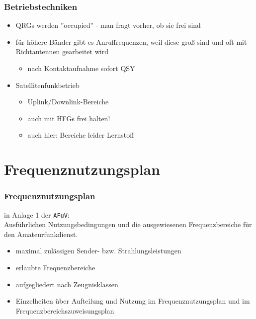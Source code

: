 \begin{frame}
    \frametitle{Betriebstechniken}

    \begin{itemize}
        \item QRGs werden ''occupied'' - man fragt vorher, ob sie frei sind
        \item für höhere Bänder gibt es Anruffrequenzen, weil diese groß sind und oft mit
              Richtantennen gearbeitet wird
        \begin{itemize}
            \item nach Kontaktaufnahme sofort QSY
        \end{itemize}
        \item Satellitenfunkbetrieb
        \begin{itemize}
            \item Uplink/Downlink-Bereiche
            \item auch mit HFGs frei halten!
            \item auch hier: Bereiche leider Lernstoff
        \end{itemize}
    \end{itemize}

\end{frame}

\section[FRQ-Nutzungsplan]{Frequenznutzungsplan}

\begin{frame}
    \frametitle{Frequenznutzungsplan}

    in Anlage 1 der \texttt{AFuV}\cite{afuv}: \\[1em]


    Ausführlichen Nutzungsbedingungen und die ausgewiesenen Frequenzbereiche für
    den Amateurfunkdienst.

    \begin{itemize}
        \item maximal zulässigen Sender- bzw. Strahlungsleistungen
        \item erlaubte Frequenzbereiche
        \item aufgegliedert nach Zeugnisklassen
        \item Einzelheiten über Aufteilung und Nutzung im
              Frequenznutzungsplan und im Frequenzbereichszuweisungsplan
    \end{itemize}
   
\end{frame}

